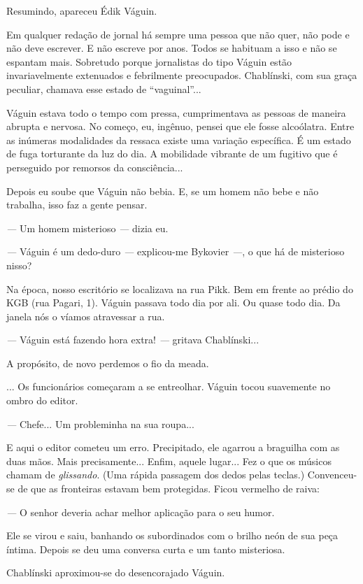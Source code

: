Resumindo, apareceu Édik Váguin.

Em qualquer redação de jornal há sempre uma pessoa que não quer, não
pode e não deve escrever. E não escreve por anos. Todos se habituam a
isso e não se espantam mais. Sobretudo porque jornalistas do tipo Váguin
estão invariavelmente extenuados e febrilmente preocupados. Chablínski,
com sua graça peculiar, chamava esse estado de ``vaguinal''...

Váguin estava todo o tempo com pressa, cumprimentava as pessoas de
maneira abrupta e nervosa. No começo, eu, ingênuo, pensei que ele fosse
alcoólatra. Entre as inúmeras modalidades da ressaca existe uma variação
específica. É um estado de fuga torturante da luz do dia. A mobilidade
vibrante de um fugitivo que é perseguido por remorsos da consciência...

Depois eu soube que Váguin não bebia. E, se um homem não bebe e não
trabalha, isso faz a gente pensar.

\emph{---} Um homem misterioso \emph{---} dizia eu.

\emph{---} Váguin é um dedo-duro \emph{---} explicou-me Bykovier
\emph{---}, o que há de misterioso nisso?

Na época, nosso escritório se localizava na rua Pikk. Bem em frente ao
prédio do KGB (rua Pagari, 1). Váguin passava todo dia por ali. Ou quase
todo dia. Da janela nós o víamos atravessar a rua.

\emph{---} Váguin está fazendo hora extra! \emph{---} gritava
Chablínski...

A propósito, de novo perdemos o fio da meada.

... Os funcionários começaram a se entreolhar. Váguin tocou suavemente
no ombro do editor.

\emph{---} Chefe... Um probleminha na sua roupa...

E aqui o editor cometeu um erro. Precipitado, ele agarrou a braguilha
com as duas mãos. Mais precisamente... Enfim, aquele lugar... Fez o que
os músicos chamam de \emph{glissando}. (Uma rápida passagem dos dedos
pelas teclas.) Convenceu-se de que as fronteiras estavam bem protegidas.
Ficou vermelho de raiva:

\emph{---} O senhor deveria achar melhor aplicação para o seu humor.

Ele se virou e saiu, banhando os subordinados com o brilho neón de sua
peça íntima. Depois se deu uma conversa curta e um tanto misteriosa.

Chablínski aproximou-se do desencorajado Váguin.

